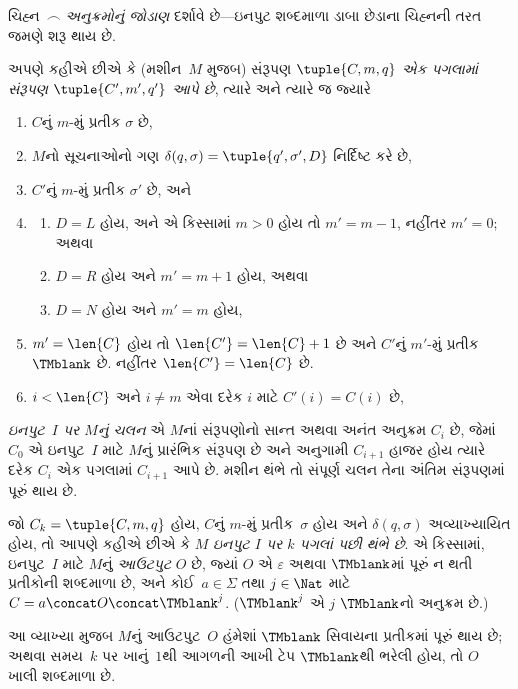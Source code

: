 \documentclass[../../../include/open-logic-section]{subfiles}
\begin{document}
\begin{explain}
ચિહ્ન~$\frown$ \emph{અનુક્રમોનું જોડાણ} દર્શાવે છે---ઇનપુટ
શબ્દમાળા ડાબા છેડાના ચિહ્નની તરત જમણે શરૂ થાય છે.
\end{explain}


\begin{defn}
અપણે કહીએ છીએ કે (મશીન~$M$ મુજબ) સંરૂપણ
$\tuple{C, m, q}$ \emph{એક પગલામાં સંરૂપણ
$\tuple{C', m', q'}$ આપે છે}, ત્યારે અને ત્યારે જ જ્યારે
\begin{enumerate}
\item $C$નું $m$-મું પ્રતીક $\sigma$ છે,
\item $M$નો સૂચનાઓનો ગણ $\delta(q, \sigma) =
  \tuple{q', \sigma', D}$ નિર્દિષ્ટ કરે છે,
\item $C'$નું $m$-મું પ્રતીક $\sigma'$ છે, અને
\item
\begin{enumerate}
\item $D = L$ હોય, અને એ કિસ્સામાં $m>0$ હોય તો
  $m' = m - 1$, નહીંતર $m'=0$; અથવા
\item $D = R$ હોય અને $m' = m + 1$ હોય, અથવા
\item $D = N$ હોય અને $m' = m$ હોય,
\end{enumerate}
\item $m' = \len{C}$ હોય તો $\len{C'} = \len{C} + 1$ છે
  અને $C'$નું $m'$-મું પ્રતીક~$\TMblank$ છે. નહીંતર
  $\len{C'}=\len{C}$ છે.
\item $i < \len{C}$ અને $i \neq m$ એવા દરેક $i$ માટે
  $C'(i) = C(i)$ છે,
\end{enumerate}
\end{defn}

\begin{defn}
\emph{ઇનપુટ~$I$ પર $M$નું ચલન} એ $M$નાં સંરૂપણોનો
સાન્ત અથવા અનંત અનુક્રમ $C_i$ છે, જેમાં $C_0$ એ ઇનપુટ~$I$ માટે
$M$નું પ્રારંભિક સંરૂપણ છે અને અનુગામી $C_{i+1}$ હાજર હોય
ત્યારે દરેક $C_i$ એક પગલામાં $C_{i+1}$ આપે છે. મશીન થંભે
તો સંપૂર્ણ ચલન તેના અંતિમ સંરૂપણમાં પૂરું થાય છે.

જો $C_k = \tuple{C, m, q}$ હોય, $C$નું $m$-મું
પ્રતીક~$\sigma$ હોય અને $\delta(q, \sigma)$ અવ્યાખ્યાયિત
હોય, તો આપણે કહીએ છીએ કે $M$ \emph{ઇનપુટ $I$ પર
$k$ પગલાં પછી થંભે છે}. એ કિસ્સામાં, ઇનપુટ~$I$ માટે
$M$નું \emph{આઉટપુટ} $O$ છે, જ્યાં $O$ એ
$\varepsilon$ અથવા $\TMblank$માં પૂરું ન થતી પ્રતીકોની
શબ્દમાળા છે, અને કોઈ~$a\in\Sigma$ તથા $j \in \Nat$ માટે
$C = a \concat O \concat \TMblank^j$.
($\TMblank^j$ એ $j$ $\TMblank$નો અનુક્રમ છે.)
\end{defn}

\begin{explain}
આ વ્યાખ્યા મુજબ $M$નું આઉટપુટ~$O$ હંમેશાં
$\TMblank$ સિવાયના પ્રતીકમાં પૂરું થાય છે; અથવા
સમય~$k$ પર ખાનું~$1$થી આગળની આખી ટેપ $\TMblank$થી
ભરેલી હોય, તો $O$ ખાલી
શબ્દમાળા છે.
\end{explain}
\end{document}
